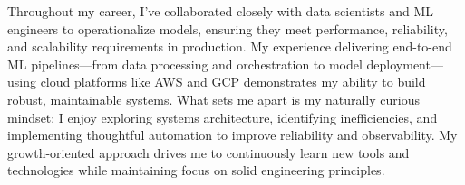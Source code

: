 \documentclass[11pt, a4paper]{awesome-cv}
\begin{document}
\begin{cvletter}
  Throughout my career, I've collaborated closely with data scientists and ML engineers to operationalize models, ensuring they meet performance, reliability, and scalability requirements in production. My experience delivering end-to-end ML pipelines—from data processing and orchestration to model deployment—using cloud platforms like AWS and GCP demonstrates my ability to build robust, maintainable systems. What sets me apart is my naturally curious mindset; I enjoy exploring systems architecture, identifying inefficiencies, and implementing thoughtful automation to improve reliability and observability. My growth-oriented approach drives me to continuously learn new tools and technologies while maintaining focus on solid engineering principles.
\end{cvletter}


\makeletterclosing
\end{document}

